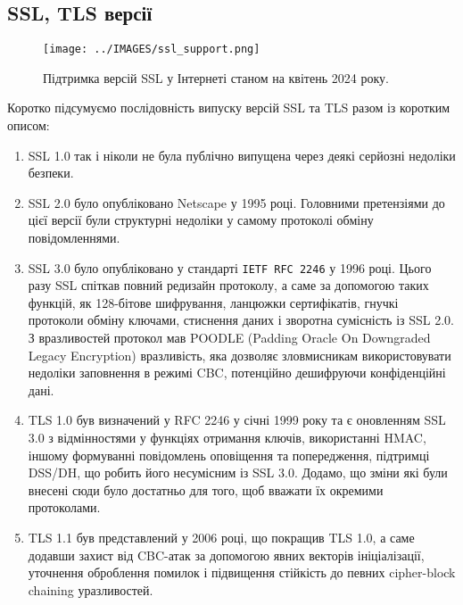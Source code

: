 \subsection{SSL, TLS версії}
\begin{figure}[ht]
        \centering
        \texttt{[image: ../IMAGES/ssl\_support.png]}
        \caption{Підтримка версій SSL у Інтернеті станом на квітень 2024 року.}
        \label{ssl_support}
\end{figure}
Коротко підсумуємо послідовність випуску версій SSL та TLS разом із коротким описом:
\begin{enumerate}
    \item SSL 1.0 так і ніколи не була публічно випущена через деякі серйозні недоліки безпеки.
    
    \item SSL 2.0 було опубліковано Netscape у 1995 році. Головними претензіями до цієї версії були структурні недоліки у самому протоколі обміну повідомленнями.
    
    \item SSL 3.0 було опубліковано у стандарті \texttt{IETF RFC 2246} у 1996 році. Цього разу SSL спіткав повний редизайн протоколу, а саме за допомогою таких функцій, як 128-бітове шифрування, ланцюжки сертифікатів, гнучкі протоколи обміну ключами, стиснення даних і зворотна сумісність із SSL 2.0. З вразливостей протокол мав POODLE (Padding Oracle On Downgraded Legacy Encryption) вразливість, яка дозволяє зловмисникам використовувати недоліки заповнення в режимі CBC, потенційно дешифруючи конфіденційні дані.
    
    \item TLS 1.0 був визначений у RFC 2246 у січні 1999 року та є оновленням SSL 3.0 з відмінностями у функціях отримання ключів, використанні HMAC, іншому формуванні повідомлень оповіщення та попередження, підтримці DSS/DH, що робить його несумісним із SSL 3.0. Додамо, що зміни які були внесені сюди було достатньо для того, щоб вважати їх окремими протоколами.
    
    \item TLS 1.1 був представлений у 2006 році, що покращив TLS 1.0, а саме додавши захист від CBC-атак за допомогою явних векторів ініціалізації, уточнення оброблення помилок і підвищення стійкість до певних cipher-block chaining уразливостей.
    

\end{enumerate}
